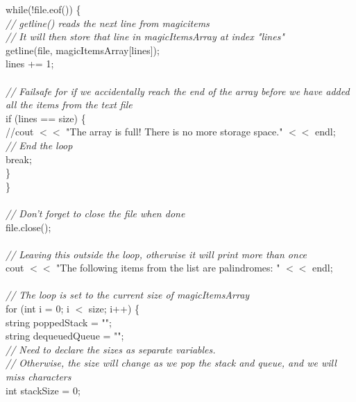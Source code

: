 \documentclass{article}
\begin{document}
\begin {linenumbers}
{    \indent while(!file.eof()) \{\\
        \textit{\indent \indent // getline() reads the next line from magicitems\\
        \indent \indent // It will then store that line in magicItemsArray at index "lines"\\}
        \indent \indent getline(file, magicItemsArray[lines]);\\
        \indent \indent lines += 1;\\
\\
        \textit{\indent \indent // Failsafe for if we accidentally reach the end of the array before we have added all the items from the text file\\}
        \indent \indent if (lines == size) \{\\
            \indent \indent \indent //cout $<<$ "The array is full! There is no more storage space." $<<$ endl;\\
            \textit{\indent \indent \indent// End the loop\\}
            \indent \indent \indent break;\\
        \indent \indent \}\\
    \indent \}\\
\\
    \textit{\indent // Don't forget to close the file when done\\}
    \indent file.close();\\
\\
    \textit{\indent // Leaving this outside the loop, otherwise it will print more than once\\}
    \indent cout $<<$ "The following items from the list are palindromes: " $<<$ endl;\\
\\
    \textit{\indent // The loop is set to the current size of magicItemsArray\\}
    \indent for (int i = 0; i $<$ size; i++) \{\\
        \indent \indent string poppedStack = "";\\
        \indent \indent string dequeuedQueue = "";\\
        \textit{\indent \indent // Need to declare the sizes as separate variables.\\
        \indent \indent // Otherwise, the size will change as we pop the stack and queue, and we will miss characters\\}
        \indent \indent int stackSize = 0;\\
}
\end{linenumbers}
\end{document}
